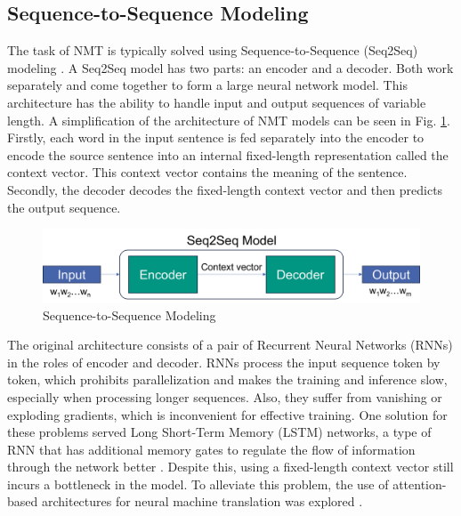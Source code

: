
\subsection{Sequence-to-Sequence Modeling}
\label{sec:Background:Seq2Seq}
The task of NMT is typically solved using Sequence-to-Sequence (Seq2Seq) modeling \parencite{seq2seq}. A Seq2Seq model has two parts: an encoder and a decoder. Both work separately and come together to form a large neural network model. This architecture has the ability to handle input and output sequences of variable length. A simplification of the architecture of NMT models can be seen in Fig. \ref{fig:seq2seq}. Firstly, each word in the input sentence is fed separately into the encoder to encode the source sentence into an internal fixed-length representation called the context vector. This context vector contains the meaning of the sentence. Secondly, the decoder decodes the fixed-length context vector and then predicts the output sequence.

\begin{figure}
  \centering
  \includegraphics[scale=0.57]{figures/seq2seq.png}
  \caption{Sequence-to-Sequence Modeling}
  \label{fig:seq2seq}
\end{figure}

The original architecture consists of a pair of Recurrent Neural Networks (RNNs) in the roles of encoder and decoder. RNNs process the input sequence token by token, which prohibits parallelization and makes the training and inference slow, especially when processing longer sequences. Also, they suffer from vanishing or exploding gradients, which is inconvenient for effective training. One solution for these problems served Long Short-Term Memory (LSTM) networks, a type of RNN that has additional memory gates to regulate the flow of information through the network better \parencite{lstm}. Despite this, using a fixed-length context vector still incurs a bottleneck in the model. To alleviate this problem, the use of attention-based architectures for neural machine translation was explored \parencite{attention}. 

